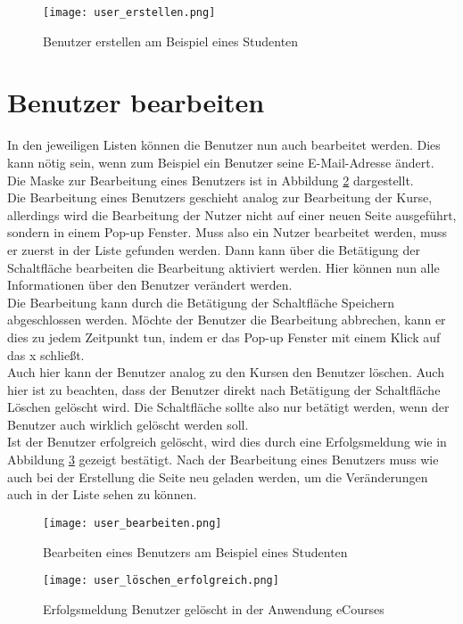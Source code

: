 \begin{figure}[h]
\centering
\texttt{[image: user\_erstellen.png]}
\caption{Benutzer erstellen am Beispiel eines Studenten}
\label{fib:benutzer_erstellen}
\end{figure}

\section{Benutzer bearbeiten}
In den jeweiligen Listen können die Benutzer nun auch bearbeitet werden. Dies kann nötig sein, wenn zum Beispiel ein Benutzer seine E-Mail-Adresse ändert. Die Maske zur Bearbeitung eines Benutzers ist in Abbildung \ref{fib:user_bearbeiten} dargestellt.\\
Die Bearbeitung eines Benutzers geschieht analog zur Bearbeitung der Kurse, allerdings wird die Bearbeitung der Nutzer nicht auf einer neuen Seite ausgeführt, sondern in einem Pop-up Fenster. Muss also ein Nutzer bearbeitet werden, muss er zuerst in der Liste gefunden werden. Dann kann über die Betätigung der Schaltfläche \glqq bearbeiten\grqq{} die Bearbeitung aktiviert werden. Hier können nun alle Informationen über den Benutzer verändert werden.\\ Die Bearbeitung kann durch die Betätigung der Schaltfläche \glqq Speichern\grqq\; abgeschlossen werden. Möchte der Benutzer die Bearbeitung abbrechen, kann er dies zu jedem  Zeitpunkt tun, indem er das Pop-up Fenster mit einem Klick auf das \glqq x\grqq{} schließt.\\
Auch hier kann der Benutzer analog zu den Kursen den Benutzer löschen. Auch hier ist zu beachten, dass der Benutzer direkt nach Betätigung der Schaltfläche \glqq Löschen\grqq{} gelöscht wird. Die Schaltfläche sollte also nur betätigt werden, wenn der Benutzer auch wirklich gelöscht werden soll.\\
Ist der Benutzer erfolgreich gelöscht, wird dies durch eine Erfolgsmeldung wie in Abbildung \ref{fib:user_löschen} gezeigt bestätigt.
Nach der Bearbeitung eines Benutzers muss wie auch bei der Erstellung die Seite neu geladen werden, um die Veränderungen auch in der Liste sehen zu können.\\

\begin{figure}[h]
\centering
\texttt{[image: user\_bearbeiten.png]}
\caption{Bearbeiten eines Benutzers am Beispiel eines Studenten}
\label{fib:user_bearbeiten}
\end{figure}

\begin{figure}[h]
\centering
\texttt{[image: user\_löschen\_erfolgreich.png]}
\caption{Erfolgsmeldung Benutzer gelöscht in der Anwendung eCourses}
\label{fib:user_löschen}
\end{figure}